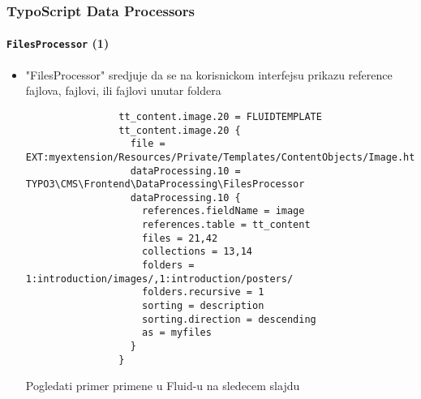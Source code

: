 
\begin{frame}[fragile]
	\frametitle{TypoScript Data Processors}
	\framesubtitle{\texttt{FilesProcessor} (1)}

	\lstset{basicstyle=\tiny\ttfamily}

	\begin{itemize}

		\item "FilesProcessor" sredjuje da se na korisnickom interfejsu prikazu reference fajlova, fajlovi, ili fajlovi unutar foldera

			\begin{lstlisting}
				tt_content.image.20 = FLUIDTEMPLATE
				tt_content.image.20 {
				  file = EXT:myextension/Resources/Private/Templates/ContentObjects/Image.html
				  dataProcessing.10 = TYPO3\CMS\Frontend\DataProcessing\FilesProcessor
				  dataProcessing.10 {
				    references.fieldName = image
				    references.table = tt_content
				    files = 21,42
				    collections = 13,14
				    folders = 1:introduction/images/,1:introduction/posters/
				    folders.recursive = 1
				    sorting = description
				    sorting.direction = descending
				    as = myfiles
				  }
				}
			\end{lstlisting}

			\small
				Pogledati primer primene u Fluid-u na sledecem slajdu
			\normalsize

	\end{itemize}

\end{frame}


